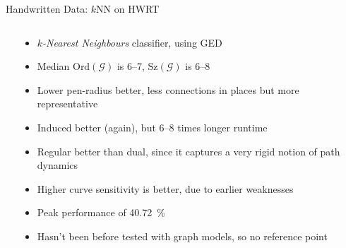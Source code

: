 \begin{frame}{Handwritten Data: $k$NN on HWRT}
\begin{columns}
\begin{column}{0.3\textwidth}
		\vspace{-2.5em}
		\begin{table}
			\centering
			\vspace{-0.5em}
			\caption{
				Curve Sensitivity (Regular, Induced, $r=1$)
			}
		\end{table}
	\end{column}
	\begin{column}{0.7\textwidth}
		\vspace{-3em}
		\begin{itemize}
			\item \emph{$k$-Nearest Neighbours} classifier, using GED
			\item Median $\text{Ord}(\mathcal{G})$ is 6--7, $\text{Sz}(\mathcal{G})$ is 6--8
			\item Lower pen-radius better, less connections in places but more representative
			\item Induced better (again), but 6--8 times longer runtime
			\item Regular better than dual, since it captures a very rigid notion of path dynamics
			\item Higher curve sensitivity is better, due to earlier weaknesses
			\item \alert{Peak performance of \SI{40.72}{\percent}}
			\item Hasn't been before tested with graph models, so no reference point
		\end{itemize}
	\end{column}
\end{columns}
\end{frame}

